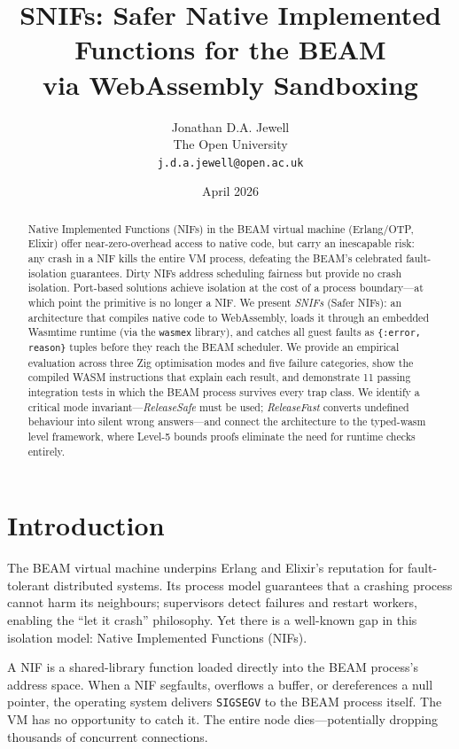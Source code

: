 \documentclass[11pt,a4paper]{article}
\title{\textbf{SNIFs: Safer Native Implemented Functions for the BEAM\\
       via WebAssembly Sandboxing}}
\author{Jonathan D.A. Jewell\\
        \small The Open University\\
        \small \texttt{j.d.a.jewell@open.ac.uk}}
\date{April 2026}
\begin{document}
\maketitle

\begin{abstract}
Native Implemented Functions (NIFs) in the BEAM virtual machine (Erlang/OTP,
Elixir) offer near-zero-overhead access to native code, but carry an
inescapable risk: any crash in a NIF kills the entire VM process, defeating
the BEAM's celebrated fault-isolation guarantees. Dirty NIFs address scheduling
fairness but provide no crash isolation. Port-based solutions achieve isolation
at the cost of a process boundary---at which point the primitive is no longer a
NIF. We present \textit{SNIFs} (Safer NIFs): an architecture that compiles native
code to WebAssembly, loads it through an embedded Wasmtime runtime (via the
\texttt{wasmex} library), and catches all guest faults as \texttt{\{:error,
reason\}} tuples before they reach the BEAM scheduler. We provide an empirical
evaluation across three Zig optimisation modes and five failure categories,
show the compiled WASM instructions that explain each result, and demonstrate
11 passing integration tests in which the BEAM process survives every trap
class. We identify a critical mode invariant---\textit{ReleaseSafe} must be
used; \textit{ReleaseFast} converts undefined behaviour into silent wrong
answers---and connect the architecture to the typed-wasm level framework, where
Level-5 bounds proofs eliminate the need for runtime checks entirely.
\end{abstract}

\tableofcontents
\newpage

\section{Introduction}

The BEAM virtual machine underpins Erlang and Elixir's reputation for
fault-tolerant distributed systems. Its process model guarantees that a
crashing process cannot harm its neighbours; supervisors detect failures and
restart workers, enabling the ``let it crash'' philosophy. Yet there is a
well-known gap in this isolation model: Native Implemented Functions (NIFs).

A NIF is a shared-library function loaded directly into the BEAM process's
address space. When a NIF segfaults, overflows a buffer, or dereferences a
null pointer, the operating system delivers \texttt{SIGSEGV} to the BEAM
process itself. The VM has no opportunity to catch it. The entire node
dies---potentially dropping thousands of concurrent connections.
\end{document}
